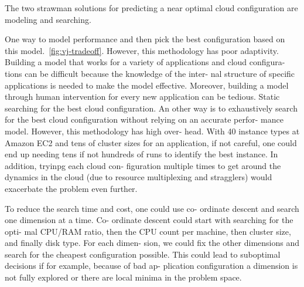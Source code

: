The two strawman solutions for predicting a near optimal cloud configuration are
modeling and searching.

 One way to
model performance and then pick the best configuration based on this
model.~\autoref{fig:vj-tradeoff}. However, this methodology has poor
adaptivity. Building a model that works for a variety of applications and cloud
configura- tions can be difficult because the knowledge of the inter- nal
structure of specific applications is needed to make the model
effective. Moreover, building a model through human intervention for every new
application can be tedious. Static searching for the best cloud
configuration. An other way is to exhaustively search for the best cloud
configuration without relying on an accurate perfor- mance model. However, this
methodology has high over- head. With 40 instance types at Amazon EC2 and tens
of cluster sizes for an application, if not careful, one could end up needing
tens if not hundreds of runs to identify the best instance. In addition, tryinpg
each cloud con- figuration multiple times to get around the dynamics in the
cloud (due to resource multiplexing and stragglers) would exacerbate the problem
even further.

To reduce the search time and cost, one could use co- ordinate descent and
search one dimension at a time. Co- ordinate descent could start with searching
for the opti- mal CPU/RAM ratio, then the CPU count per machine, then cluster
size, and finally disk type. For each dimen- sion, we could fix the other
dimensions and search for the cheapest configuration possible. This could lead
to suboptimal decisions if for example, because of bad ap- plication
configuration a dimension is not fully explored or there are local minima in the
problem space.

